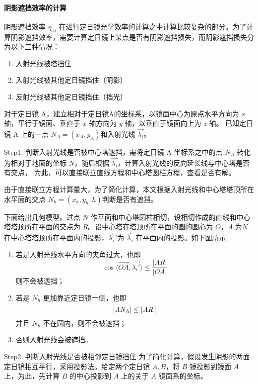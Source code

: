 \documentclass[../main.tex]{subfiles}
\begin{document}
\paragraph{阴影遮挡效率的计算}
阴影遮挡效率 \(\eta _{\mathrm{s b}}\) 在进行定日镜光学效率的计算之中计算比较复杂的部分。为了计算阴影遮挡效率，需要计算定日镜上某点是否有阴影遮挡损失，而阴影遮挡损失分为以下三种情况：
\begin{enumerate}
\item 入射光线被塔挡住
\item 入射光线被其他定日镜挡住（阴影）
\item 反射光线被其他定日镜挡住（挡光）
\end{enumerate}
对于定日镜 A，建立相对于定日镜A的坐标系，以镜面中心为原点水平方向为 \(x\) 轴，平行于镜面、垂直于 \(x\) 轴方向为 \(y\) 轴，以垂直于镜面向上为 \(z\) 轴。
已知定日镜 A 上的一点 \(N_{A} = (x_{A}, y_{A})\)和入射光线 \(\vec {\lambda _{i}}\)。


Step1. 判断入射光线是否被中心塔遮挡，需将定日镜 A 坐标系之中的点 \(N_{A}\) 转化为相对于地面的坐标 \(N\)，随后根据 \(\vec {\lambda _{i}}\)，计算入射光线的反向延长线与中心塔是否有交点，
为此，可以直接联立直线方程和中心塔圆柱方程，查看是否有解。

由于直接联立方程计算量大，为了简化计算，本文根据入射光线和中心塔塔顶所在水平面的交点 \(N_{h} = (x _{h} , y_{h}, h)\)判断是否有遮挡。

下面给出几何模型。过点 \(N\) 作平面和中心塔圆柱相切，设相切作成的直线和中心塔塔顶所在平面的交点为 \(R\)。设中心塔在塔顶所在平面的圆的圆心为 \(O\)，\(A\) 为\(N\)在中心塔塔顶所在平面内的投影，\(\vec \lambda _{i} '\)为 \(\vec \lambda _{i}\) 在平面内的投影。如下图所示

\begin{enumerate}
\item 若是入射光线水平方向的夹角过大，也即
\begin{equation}
\cos \langle \overrightarrow {OA}, \vec {\lambda _{i} '} \rangle \le \frac{\vert AR \vert }{\vert OA \vert }
\end{equation}
则不会被遮挡；
\item 若是 \(N_{h}\) 更加靠近定日镜一侧，也即
\begin{equation}
\vert {\it A N}_{h}\vert \le \vert {\it AR\,} \vert
\end{equation}并且 \(N_{h}\) 不在圆内，则不会被遮挡；
\item 否则入射光线会被遮挡。
\end{enumerate}

Step2. 判断入射光线是否被相邻定日镜挡住
为了简化计算，假设发生阴影的两面定日镜相互平行，采用投影法。给定两个定日镜 \(A, B\)，将 \(B\) 镜投影到镜面 \(A\) 上，为此，先计算 \(B\) 的中心投影到 \(A\) 上的关于 \(A\) 镜面系的坐标。
\end{document}
